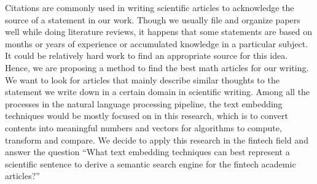 Citations are commonly used in writing scientific articles to acknowledge the source of a statement in our work.
Though we usually file and organize papers well while doing literature reviews, it happens that some statements are based on months or years of experience or accumulated knowledge in a particular subject.
It could be relatively hard work to find an appropriate source for this idea.
Hence, we are proposing a method to find the best math articles for our writing.
We want to look for articles that mainly describe similar thoughts to the statement we write down in a certain domain in scientific writing.
Among all the processes in the natural language processing pipeline, the text embedding techniques would be mostly focused on in this research, which is to convert contents into meaningful numbers and vectors for algorithms to compute, transform and compare.
We decide to apply this research in the fintech field and answer the question “What text embedding techniques can best represent a scientific sentence to derive a semantic search engine for the fintech academic articles?”